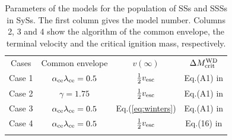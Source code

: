 \documentclass{elsart}
\begin{document}
\begin{table}
  \caption{Parameters of the models for the population of SSs and SSSs in SySs. The first column
           gives the model number. Columns 2, 3 and 4 show the algorithm of the common envelope,
           the terminal velocity and the critical ignition mass, respectively.
           }
  \begin{center}
  \begin{tabular}{cccc}
  \hline
Cases & Common envelope&$v(\infty)$&$\Delta M_{\rm crit}^{\rm WD}$ \\
Case 1& $\alpha_{\rm ce}\lambda_{\rm ce}=0.5$&$\frac{1}{2}v_{\rm esc}$   &Eq.(A1) in \citet{n04}\\
Case 2& $\gamma=1.75$                        &$\frac{1}{2}v_{\rm esc}$   &Eq.(A1) in \citet{n04}\\
Case 3& $\alpha_{\rm ce}\lambda_{\rm ce}=0.5$&Eq.(\ref{eq:winters})      &Eq.(A1) in \citet{n04}\\
Case 4& $\alpha_{\rm ce}\lambda_{\rm ce}=0.5$&$\frac{1}{2}v_{\rm esc}$   &Eq.(16) in \citet{yun95}\\
\hline
 \label{tab:case}
\end{tabular}
\end{center}
\end{table}
\end{document}
